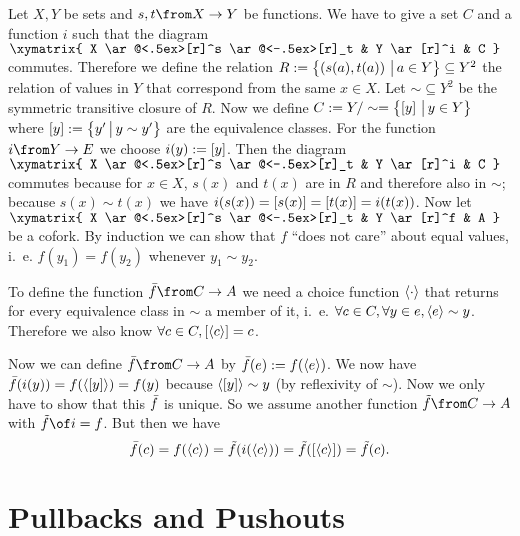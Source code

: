 \begin{example}
  Let $X, Y$ be sets and $s, t \from X \to Y$ be functions.
  We have to give a set $C$ and a function $i$ such that the diagram
  $ \xymatrix{
    X \ar@<.5ex>[r]^s \ar@<-.5ex>[r]_t & Y \ar[r]^i & C
  } $
  commutes.
  Therefore we define the relation
  $R := \bigl \{ \left( s(a) , t(a) \right) \,\big|\, a \in Y \bigr \} \subseteq Y^2$ the relation of values in $Y$ that correspond from the same $x \in X$.
  Let $\sim \subseteq Y^2$ be the symmetric transitive closure of $R$.
  Now we define $C := Y / \sim = \bigl \{ \left[ y \right] \,\big|\, y \in Y \bigr \}$ where $\left[ y \right] := \bigl \{ y' \,\big|\, y \sim y' \bigr \}$ are the equivalence classes.
  For the function $i \from Y \to E$ we choose $i(y) := \left[ y \right]$.
  Then the diagram
  $ \xymatrix{
    X \ar@<.5ex>[r]^s \ar@<-.5ex>[r]_t & Y \ar[r]^i & C
  } $
  commutes because for $x \in X$, $s(x)$ and $t(x)$ are in $R$ and therefore also in $\sim$; because $s(x) \sim t(x)$ we have $i(s(x)) = \left[ s(x) \right] = \left[ t(x) \right] = i(t(x))$.
  Now let
  $ \xymatrix{
    X \ar@<.5ex>[r]^s \ar@<-.5ex>[r]_t & Y \ar[r]^f & A
  } $
  be a cofork.
  By induction we can show that $f$ ``does not care'' about equal values, i.~e. $f(y_1) = f(y_2)$ whenever $y_1 \sim y_2$.

  To define the function $\fbar \from C \to A$ we need a choice function $\left< \cdot \right>$ that returns for every equivalence class in $\sim$ a member of it, i.~e.
  $\forall c \in C, \forall y \in e, \left< e \right> \sim y$.
  Therefore we also know $\forall c \in C, \left[ \left< c \right> \right] = c$.

  Now we can define $\fbar \from C \to A$ by $\bar{f}(e) := f(\left< e \right>)$.
  We now have  $\bar{f}(i(y)) = f(\left< \left[ y \right] \right>) = f(y)$ because $\left< \left[ y \right] \right> \sim y$ (by reflexivity of $\sim$).
  Now we only have to show that this $\bar{f}$ is unique. So we assume another function $\ftilde \from C \to A$ with $\ftilde \of i = f$. But then we have
  $$ \bar{f}(c) = f(\left< c \right>) = \tilde{f}(i(\left< c \right>)) = \tilde{f}(\left[ \left< c \right> \right]) = \tilde{f}(c).$$
\end{example}


\section*{Pullbacks and Pushouts}

